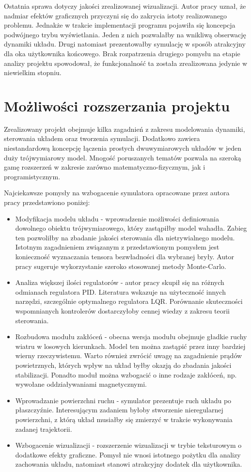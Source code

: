\documentclass[12pt, oneside]{report}
\theoremstyle{definition}
\begin{document}
Ostatnia sprawa dotyczy jakości zrealizowanej wizualizacji. Autor pracy uznał, że nadmiar efektów graficznych przyczyni się do zakrycia istoty realizowanego problemu. Jednakże w trakcie implementacji programu pojawiła się koncepcja podwójnego trybu wyświetlania. Jeden z nich pozwalałby na wnikliwą obserwację dynamiki układu. Drugi natomiast prezentowałby symulację w sposób atrakcyjny dla oka użytkownika końcowego. Brak rozpatrzenia drugiego pomysłu na etapie analizy projektu spowodował, że funkcjonalność ta została zrealizowana jedynie w niewielkim stopniu.

\section{Możliwości rozszerzania projektu}
Zrealizowany projekt obejmuje kilka zagadnień z zakresu modelowania dynamiki, sterowania układem oraz tworzenia symulacji. Dodatkowo zawiera niestandardową koncepcję łączenia prostych dwuwymiarowych układów w jeden duży trójwymiarowy model. Mnogość poruszanych tematów pozwala na szeroką gamę rozszerzeń w zakresie zarówno matematyczno-fizycznym, jak i programistycznym.

Najciekawsze pomysły na wzbogacenie symulatora opracowane przez autora pracy przedstawiono poniżej:
\begin{itemize}
\item Modyfikacja modelu układu - wprowadzenie możliwości definiowania dowolnego obiektu trójwymiarowego, który zastąpiłby model wahadła. Zabieg ten pozwoliłby na zbadanie jakości sterowania dla nietrywialnego modelu. Istotnym zagadnieniem związanym z przedstawionym pomysłem jest konieczność wyznaczania tensora bezwładności dla wybranej bryły. Autor pracy sugeruje wykorzystanie szeroko stosowanej metody Monte-Carlo.
\item Analiza większej ilości regulatorów - autor pracy skupił się na różnych odmianach regulatora PID. Literatura wskazuje na użyteczność innych narzędzi, szczególnie optymalnego regulatora LQR. Porównanie skuteczności wspomnianych kontrolerów dostarczyłoby cennej wiedzy z zakresu teorii sterowania.
\item Rozbudowa modułu zakłóceń - obecna wersja modułu obejmuje gładkie ruchy wiatru w losowych kierunkach. Model ten można zastąpić przez inny bardziej wierny rzeczywistemu. Warto również zwrócić uwagę na zagadnienie prądów powietrznych, których wpływ na układ byłby okazją do zbadania jakości stabilizacji. Ponadto moduł można wzbogacić o inne rodzaje zakłóceń, np. wywołane oddziaływaniami magnetycznymi.
\item Wprowadzanie powierzchni ruchu - symulator prezentuje ruch układu po płaszczyźnie. Interesującym zadaniem byłoby stworzenie nieregularnej powierzchni, z którą układ musiałby się zmierzyć w trakcie wykonywania zadanej trajektorii.
\item Wzbogacenie wizualizacji - rozszerzenie wizualizacji w trybie teksturowym o dodatkowe efekty graficzne. Pomysł nie wnosi istotnego pożytku dla analizy zachowania układu, natomiast stanowi atrakcyjny dodatek dla użytkownika.
\end{itemize} 
\end{document}
